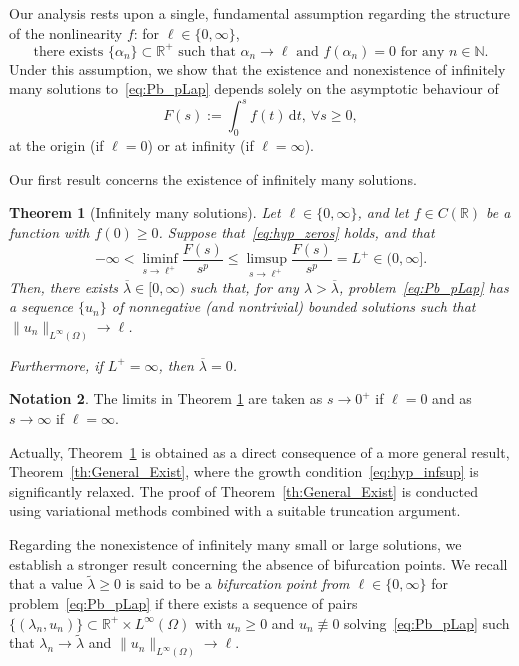 \documentclass[10pt,twoside,english,reqno,a4paper]{amsart}
\theoremstyle{plain}
\theoremstyle{plain}
\newtheorem{theorem}{Theorem}[section]
\theoremstyle{definition}
\newtheorem{notation}[theorem]{Notation}
\theoremstyle{remark}
\numberwithin{equation}{section}
\newcommand{\N}{\mathbb{N}}
\newcommand{\R}{\mathbb{R}}
\def\lio{{L^{\infty}(\Omega)}}
\newcommand{\oL}{L^+}
\begin{document}
Our analysis rests upon a single, fundamental assumption regarding the structure of the nonlinearity $f$: for $\ell\in \{0,\infty\}$, 
\begin{equation}
\label{eq:hyp_zeros}
\text{there exists $\{\alpha_n\}\subset \R^+$ such that $\alpha_n\to \ell$ and $f(\alpha_n)=0$ for any $n\in\N$.}
\end{equation}
Under this assumption, we show that the existence and nonexistence of infinitely many solutions to~\eqref{eq:Pb_pLap} depends solely on the asymptotic behaviour of
\[
F(s):=\int_0^s f(t)\, \mathrm{d}t,\ \forall s\geq 0,
\]
at the origin (if $\ell=0$) or at infinity (if $\ell = \infty$).

Our first result concerns the existence of infinitely many solutions.

\begin{theorem}[Infinitely many solutions]
\label{th:Intro_Exist}
Let $\ell\in \{0,\infty\}$, and let $f\in C(\R)$ be a function with $f(0)\geq 0$. Suppose that~\eqref{eq:hyp_zeros} holds, and that
\begin{equation}
\label{eq:hyp_infsup}
    -\infty <\liminf_{s\to \ell^+} \frac{F(s)}{s^p} \leq \limsup_{s\to \ell^+} \frac{F(s)}{s^p} = \oL \in (0,\infty].
\end{equation}
Then, there exists $\overline{\lambda} \in [0,\infty)$ such that, for any $\lambda>\overline{\lambda}$, problem~\eqref{eq:Pb_pLap} has a sequence $\{u_n\}$ of nonnegative (and nontrivial) bounded solutions such that $\|u_n\|_\lio \to \ell$.

Furthermore, if $\oL=\infty$, then $\overline{\lambda}=0$.
\end{theorem}

\begin{notation}
The limits in Theorem \ref{th:Intro_Exist} are taken as $s\to0^+$ if $\ell=0$ and as $s\to\infty$ if $\ell=\infty$.
\end{notation}

Actually, Theorem~\ref{th:Intro_Exist} is obtained as a direct consequence of a more general result, Theorem~\ref{th:General_Exist}, where the growth condition~\eqref{eq:hyp_infsup} is significantly relaxed. The proof of Theorem~\ref{th:General_Exist} is conducted using variational methods combined with a suitable truncation argument.

Regarding the nonexistence of infinitely many small or large solutions, we establish a stronger result concerning the absence of bifurcation points. We recall that a value $\tilde \lambda\geq 0$ is said to be a \textit{bifurcation point from $\ell\in\{0,\infty\}$} for problem~\eqref{eq:Pb_pLap} if there exists a sequence of pairs $\{(\lambda_n,u_n)\} \subset \R^+ \times L^\infty(\Omega)$ with $u_n\geq 0$ and $u_n \not\equiv 0$ solving~\eqref{eq:Pb_pLap} such that $\lambda_n\to \tilde\lambda$ and $\|u_n\|_\lio \to \ell$.
\end{document}
